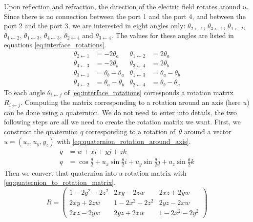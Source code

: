 Upon reflection and refraction, the direction of the electric field rotates around $u$.
Since there is no connection between the port 1 and the port 4, and between the port 2 and the port 3, we are interested in eight angles only:
$\theta_{2 \leftarrow 1}$, $\theta_{3 \leftarrow 1}$,
$\theta_{1 \leftarrow 2}$, $\theta_{4 \leftarrow 2}$,
$\theta_{1 \leftarrow 3}$, $\theta_{4 \leftarrow 3}$,
$\theta_{2 \leftarrow 4}$ and $\theta_{3 \leftarrow 4}$.
The values for these angles are listed in equations \cref{eq:interface_rotations}.
\begin{equation}
    \begin{aligned}
        \theta_{2 \leftarrow 1} &= -2\theta_a
        &
        \theta_{1 \leftarrow 2} &= 2\theta_a
        \\
        \theta_{4 \leftarrow 3} &= -2\theta_b
        &
        \theta_{3 \leftarrow 4} &= 2\theta_b
        \\
        \theta_{3 \leftarrow 1} &= \theta_b - \theta_a
        &
        \theta_{1 \leftarrow 3} &= \theta_a - \theta_b
        \\
        \theta_{4 \leftarrow 2} &= \theta_a - \theta_b
        &
        \theta_{2 \leftarrow 4} &= \theta_b - \theta_a
    \end{aligned}
    \label{eq:interface_rotations}
\end{equation}
To each angle $\theta_{i \leftarrow j}$ of \cref{eq:interface_rotations} corresponds a rotation matrix $R_{i \leftarrow j}$.
Computing the matrix corresponding to a rotation around an axis (here $u$) can be done using a quaternion.
We do not need to enter into details, the two following steps are all we need to create the rotation matrix we want.
First, we construct the quaternion $q$ corresponding to a rotation of~$\theta$ around a vector $u=(u_x, u_y, y_z)$ with
\cref{eq:quaternion_rotation_around_axis}.
\begin{equation}
    \begin{aligned}
        q &= w + xi + yj + zk
        \\
        q &= \cos \frac{\theta}{2}
           + u_x \sin \frac{\theta}{2} i
           + u_y \sin \frac{\theta}{2} j
           + u_z \sin \frac{\theta}{2} k
    \end{aligned}
    \label{eq:quaternion_rotation_around_axis}
\end{equation}
Then we convert that quaternion into a rotation matrix with  \cref{eq:quaternion_to_rotation_matrix}.
\begin{equation}
    R =
    \begin{pmatrix}
        1 - 2y^2 - 2z^2   &   2xy - 2zw         &   2xz + 2yw \\
        2xy + 2zw         &   1 - 2x^2 - 2z^2   &   2yz - 2xw \\
        2xz - 2yw         &   2yz + 2xw         &   1 - 2x^2 - 2y^2
    \end{pmatrix}
    \label{eq:quaternion_to_rotation_matrix}
\end{equation}


